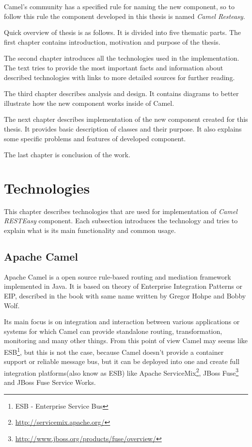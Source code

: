 \documentclass[12pt,final,oneside]{fithesis2}
\begin{document}
Camel's community has a specified rule for naming the new component, so to follow this rule the component developed in this thesis is named \textit{Camel Resteasy}.

Quick overview of thesis is as follows. It is divided into five thematic parts. The first chapter
contains introduction, motivation and purpose of the thesis.

The second chapter introduces all the technologies used in the implementation. The text tries to provide the most important facts and information about described technologies with links to more detailed sources for further reading.

The third chapter describes analysis and design. It contains diagrams to better illustrate how the new component works inside of Camel.

The next chapter describes implementation of the new component created for this thesis. It provides basic description of classes and their purpose. It also explains some specific problems and features of developed component.

The last chapter is conclusion of the work.


\chapter{Technologies}\label{tech}
This chapter describes technologies that are used for implementation of \textit{Camel RESTEasy}  component. Each subsection introduces the technology and tries to explain what is its main functionality and common usage.

\section{Apache Camel}
Apache Camel is a open source rule-based routing and mediation framework implemented in Java\cite{java-web}. It is based on theory of Enterprise Integration Patterns or EIP, described in the book with same name written by Gregor Hohpe and Bobby Wolf\cite{eip}.

Its main focus is on integration and interaction between various applications or systems for which Camel can provide standalone routing, transformation, monitoring and many other things. From this point of view Camel may seems like ESB\footnote{ESB - Enterprise Service Bus}, but this is not the case, because Camel doesn't provide a container support or reliable message bus, but it can be deployed into one and create full integration platforms(also know as ESB) like Apache ServiceMix\footnote{\url{http://servicemix.apache.org/}}, JBoss Fuse\footnote{\url{http://www.jboss.org/products/fuse/overview/}} and JBoss Fuse Service Works. 
\end{document}
